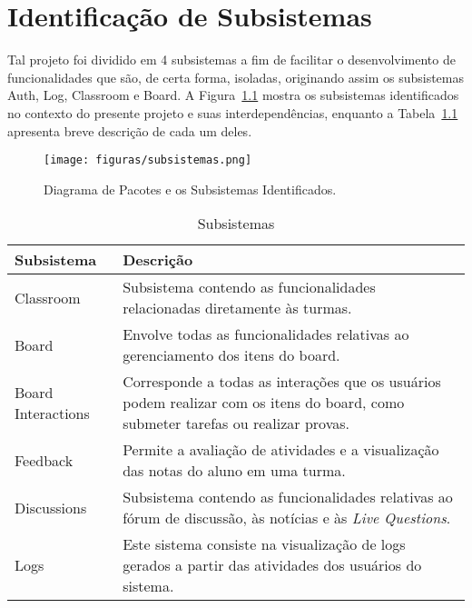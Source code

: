 \chapter{ Identificação de Subsistemas}
\label{sec-subsistemas}

Tal projeto foi dividido em 4 subsistemas a fim de facilitar o desenvolvimento de funcionalidades que são, de certa forma, isoladas, originando assim os subsistemas Auth, Log, Classroom e Board.
A Figura~\ref{figura-subsistema} mostra os subsistemas identificados no contexto do presente projeto e suas interdependências, enquanto a Tabela~\ref{tabela-subsistema} apresenta breve descrição de cada um deles.


\begin{figure}[h]
	\centering
	\texttt{[image: figuras/subsistemas.png]}
	\caption{Diagrama de Pacotes e os Subsistemas Identificados.}
	\label{figura-subsistema}
\end{figure} 

\begin{table}[h]
	\centering	
	\vspace{0.5cm}
	\caption{ Subsistemas}
	\label{tabela-subsistema}
	\begin{tabular}{|p{3cm}|p{12cm}|}  \hline \rowcolor[rgb]{0.8,0.8,0.8}
		
		Subsistema & Descrição \\\hline 
		
		Classroom & Subsistema contendo as funcionalidades relacionadas diretamente às turmas.  \\\hline
		
		Board & Envolve todas as funcionalidades relativas ao gerenciamento dos itens do board. \\\hline
		
		Board Interactions & Corresponde a todas as interações que os usuários podem realizar com os itens do board, como submeter tarefas ou realizar provas. \\\hline
		
		Feedback & Permite a avaliação de atividades e a visualização das notas do aluno em uma turma. \\\hline
		
		Discussions & Subsistema contendo as funcionalidades relativas ao fórum de discussão, às notícias e às \textit{Live Questions}. \\\hline
		
		Logs & Este sistema consiste na visualização de logs gerados a partir das atividades dos usuários do sistema. \\\hline  
		
	\end{tabular}	
\end{table}
